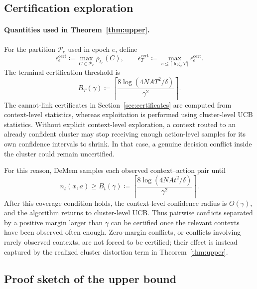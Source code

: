 \documentclass{article}
\theoremstyle{plain}
\theoremstyle{definition}
\theoremstyle{remark}
\newcommand{\eps}{\epsilon}
\begin{document}
\subsection{Certification exploration}
\label{app:cert-exploration}
\paragraph{Quantities used in Theorem~\ref{thm:upper}.}
For the partition \(\mathcal P_e\) used in epoch \(e\), define
\[
\eps^{\mathrm{cert}}_e
\coloneqq
\max_{C\in\mathcal P_e}\overline\rho_{t_e}(C),
\qquad
\bar\eps^{\mathrm{cert}}_T
\coloneqq
\max_{e\le\lceil\log_2 T\rceil}\eps^{\mathrm{cert}}_e .
\]
The terminal certification threshold is
\[
B_T(\gamma)
\coloneqq
\left\lceil
\frac{8\log(4NAT^2/\delta)}{\gamma^2}
\right\rceil .
\]
The cannot-link certificates in Section~\ref{sec:certificates} are computed
from context-level statistics, whereas exploitation is performed using
cluster-level UCB statistics. Without explicit context-level exploration, a
context routed to an already confident cluster may stop receiving enough
action-level samples for its own confidence intervals to shrink. In that
case, a genuine decision conflict inside the cluster could remain
uncertified.

For this reason, DeMem samples each observed context--action pair
until
\[
n_t(x,a)\ge
B_t(\gamma)
\coloneqq
\left\lceil
\frac{8\log(4NAt^2/\delta)}{\gamma^2}
\right\rceil .
\]
After this coverage condition holds, the context-level confidence radius is
\(O(\gamma)\), and the algorithm returns to cluster-level UCB. Thus
pairwise conflicts separated by a positive margin larger than \(\gamma\)
can be certified once the relevant contexts have been observed often enough.
Zero-margin conflicts, or conflicts involving rarely observed contexts, are
not forced to be certified; their effect is instead captured by the
realized cluster distortion term in Theorem~\ref{thm:upper}.

\subsection{Proof sketch of the upper bound}
\label{app:upper-proof}
\end{document}
